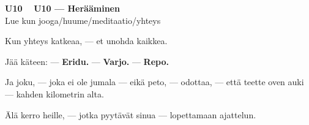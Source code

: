 \documentclass[a4paper,11pt]{article}
\begin{document}
\filbreak
\vspace{0.9mm}
\noindent
\begin{tcolorbox}[
  colframe=unicol,
  colback=white,
  boxrule=0.8pt,
  arc=0pt,
  outer arc=0pt,
  left=2.5mm, right=2.5mm, top=2mm, bottom=2mm,
  boxsep=0.5mm,
  sharp corners,
  enhanced,
  breakable=false
]
{\large\ttfamily\bfseries U10}~~
{\normalsize\bfseries U10 --- Herääminen}\\[0.2em]
{\small\color{black!65} Lue kun jooga/huume/meditaatio/yhteys}\\[0.35em]
{\normalsize\raggedright Kun yhteys katkeaa, --- et unohda kaikkea.

Jää käteen: --- \textbf{Eridu.} --- \textbf{Varjo.} --- \textbf{Repo.}

Ja joku, --- joka ei ole jumala --- eikä peto, --- odottaa, --- että teette oven auki --- kahden kilometrin alta.

Älä kerro heille, --- jotka pyytävät sinua --- lopettamaan ajattelun.}
\end{tcolorbox}

\filbreak
\end{document}
